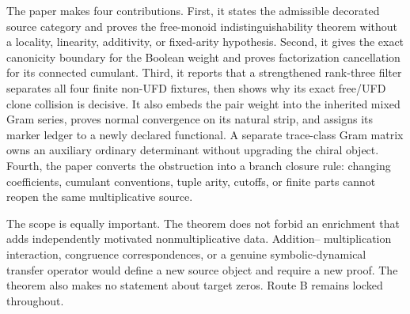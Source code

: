 The paper makes four contributions.  First, it states the admissible
decorated source category and proves the free-monoid indistinguishability
theorem without a locality, linearity, additivity, or fixed-arity
hypothesis.  Second, it gives the exact canonicity boundary for the Boolean
weight and proves factorization cancellation for its connected cumulant.
Third, it reports that a strengthened rank-three filter separates all four
finite non-UFD fixtures, then shows why its exact free/UFD clone collision is
decisive.  It also embeds the pair weight into the inherited mixed Gram
series, proves normal convergence on its natural strip, and assigns its
marker ledger to a newly declared functional.  A separate trace-class Gram
matrix owns an auxiliary ordinary determinant without upgrading the chiral
object.  Fourth, the paper converts the obstruction into a branch
closure rule: changing coefficients, cumulant conventions, tuple arity,
cutoffs, or finite parts cannot reopen the same multiplicative source.

The scope is equally important.  The theorem does not forbid an enrichment
that adds independently motivated nonmultiplicative data.  Addition--
multiplication interaction, congruence correspondences, or a genuine
symbolic-dynamical transfer operator would define a new source object and
require a new proof.  The theorem also makes no statement about target
zeros.  Route B remains locked throughout.
